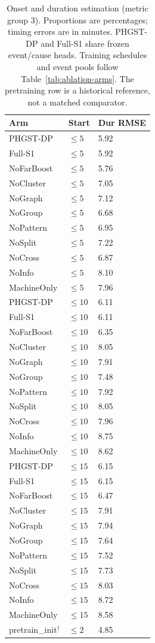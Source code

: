 \begin{table}[p]
\centering
\scriptsize
\setlength{\tabcolsep}{3pt}
\renewcommand{\arraystretch}{1.12}
\caption{Onset and duration estimation (metric group 3). Proportions are percentages; timing errors are in minutes. PHGST-DP and Full-S1 share frozen event/cause heads. Training schedules and event pools follow Table~\ref{tab:ablation-arms}. The pretraining row is a historical reference, not a matched comparator.}
\label{tab:complete-2-3}
\begin{tabularx}{\textwidth}{@{}lXX@{}}
\toprule
Arm & Start & \textbf{Dur RMSE} \\
\midrule
PHGST-DP & $\le 5$ & 5.92 \\
Full-S1 & $\le 5$ & 5.92 \\
NoFarBoost & $\le 5$ & 5.76 \\
NoCluster & $\le 5$ & 7.05 \\
NoGraph & $\le 5$ & 7.12 \\
NoGroup & $\le 5$ & 6.68 \\
NoPattern & $\le 5$ & 6.95 \\
NoSplit & $\le 5$ & 7.22 \\
NoCross & $\le 5$ & 6.87 \\
NoInfo & $\le 5$ & 8.10 \\
MachineOnly & $\le 5$ & 7.96 \\
\midrule
PHGST-DP & $\le 10$ & 6.11 \\
Full-S1 & $\le 10$ & 6.11 \\
NoFarBoost & $\le 10$ & 6.35 \\
NoCluster & $\le 10$ & 8.05 \\
NoGraph & $\le 10$ & 7.91 \\
NoGroup & $\le 10$ & 7.48 \\
NoPattern & $\le 10$ & 7.92 \\
NoSplit & $\le 10$ & 8.05 \\
NoCross & $\le 10$ & 7.96 \\
NoInfo & $\le 10$ & 8.75 \\
MachineOnly & $\le 10$ & 8.62 \\
\midrule
PHGST-DP & $\le 15$ & 6.15 \\
Full-S1 & $\le 15$ & 6.15 \\
NoFarBoost & $\le 15$ & 6.47 \\
NoCluster & $\le 15$ & 7.91 \\
NoGraph & $\le 15$ & 7.94 \\
NoGroup & $\le 15$ & 7.64 \\
NoPattern & $\le 15$ & 7.52 \\
NoSplit & $\le 15$ & 7.73 \\
NoCross & $\le 15$ & 8.03 \\
NoInfo & $\le 15$ & 8.72 \\
MachineOnly & $\le 15$ & 8.58 \\
\midrule
pretrain\_init$^\dagger$ & $\le 2$ & 4.85 \\
\bottomrule
\end{tabularx}
\end{table}


